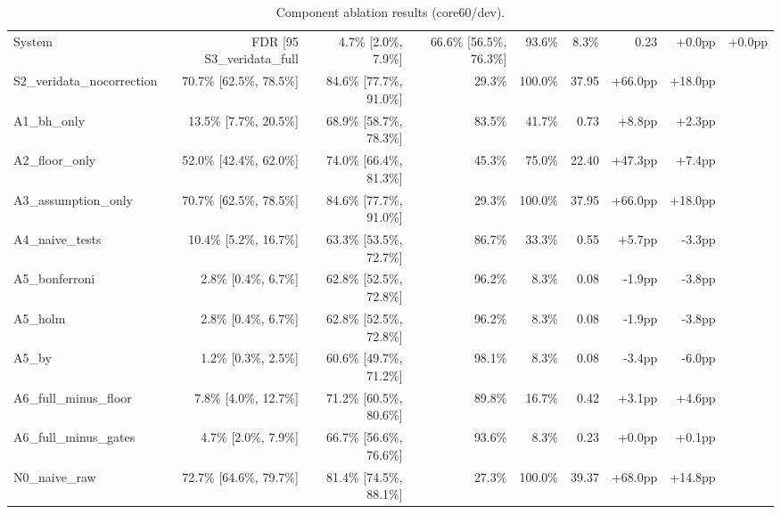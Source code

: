 \begin{table}[htbp]
\centering
\caption{Component ablation results (core60/dev).}
\label{tab:table_e2_ablation}
\begin{tabular}{lrrrrrrr}
\toprule
System & FDR [95%
\midrule
S3\_veridata\_full & 4.7\% [2.0\%, 7.9\%] & 66.6\% [56.5\%, 76.3\%] & 93.6\% & 8.3\% & 0.23 & +0.0pp & +0.0pp \\
S2\_veridata\_nocorrection & 70.7\% [62.5\%, 78.5\%] & 84.6\% [77.7\%, 91.0\%] & 29.3\% & 100.0\% & 37.95 & +66.0pp & +18.0pp \\
A1\_bh\_only & 13.5\% [7.7\%, 20.5\%] & 68.9\% [58.7\%, 78.3\%] & 83.5\% & 41.7\% & 0.73 & +8.8pp & +2.3pp \\
A2\_floor\_only & 52.0\% [42.4\%, 62.0\%] & 74.0\% [66.4\%, 81.3\%] & 45.3\% & 75.0\% & 22.40 & +47.3pp & +7.4pp \\
A3\_assumption\_only & 70.7\% [62.5\%, 78.5\%] & 84.6\% [77.7\%, 91.0\%] & 29.3\% & 100.0\% & 37.95 & +66.0pp & +18.0pp \\
A4\_naive\_tests & 10.4\% [5.2\%, 16.7\%] & 63.3\% [53.5\%, 72.7\%] & 86.7\% & 33.3\% & 0.55 & +5.7pp & -3.3pp \\
A5\_bonferroni & 2.8\% [0.4\%, 6.7\%] & 62.8\% [52.5\%, 72.8\%] & 96.2\% & 8.3\% & 0.08 & -1.9pp & -3.8pp \\
A5\_holm & 2.8\% [0.4\%, 6.7\%] & 62.8\% [52.5\%, 72.8\%] & 96.2\% & 8.3\% & 0.08 & -1.9pp & -3.8pp \\
A5\_by & 1.2\% [0.3\%, 2.5\%] & 60.6\% [49.7\%, 71.2\%] & 98.1\% & 8.3\% & 0.08 & -3.4pp & -6.0pp \\
A6\_full\_minus\_floor & 7.8\% [4.0\%, 12.7\%] & 71.2\% [60.5\%, 80.6\%] & 89.8\% & 16.7\% & 0.42 & +3.1pp & +4.6pp \\
A6\_full\_minus\_gates & 4.7\% [2.0\%, 7.9\%] & 66.7\% [56.6\%, 76.6\%] & 93.6\% & 8.3\% & 0.23 & +0.0pp & +0.1pp \\
N0\_naive\_raw & 72.7\% [64.6\%, 79.7\%] & 81.4\% [74.5\%, 88.1\%] & 27.3\% & 100.0\% & 39.37 & +68.0pp & +14.8pp \\
\bottomrule
\end{tabular}
\end{table}
